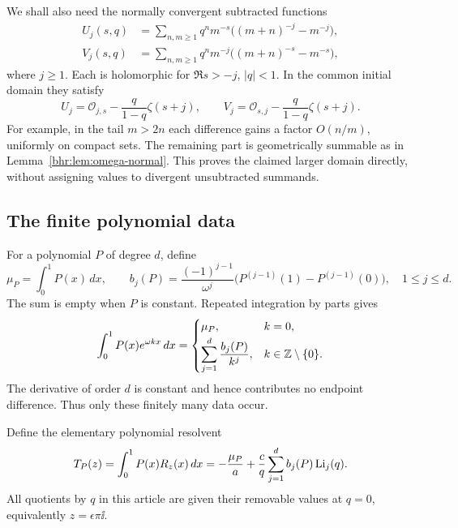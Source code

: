 We shall also need the normally convergent subtracted functions
\begin{align}
 U_j(s,q)&=\sum_{n,m\ge1}q^n m^{-s}
       \bigl((m+n)^{-j}-m^{-j}\bigr),\label{bhr:eq:U}\\
 V_j(s,q)&=\sum_{n,m\ge1}q^n m^{-j}
       \bigl((m+n)^{-s}-m^{-s}\bigr),\label{bhr:eq:V}
\end{align}
where $j\ge1$. Each is holomorphic for $\Re s>-j$, $|q|<1$.
In the common initial domain they satisfy
\begin{equation}\label{bhr:eq:UV-continuation}
 U_j=\mathcal O_{j,s}-\frac{q}{1-q}\zeta(s+j),\qquad
 V_j=\mathcal O_{s,j}-\frac{q}{1-q}\zeta(s+j).
\end{equation}
For example, in the tail $m>2n$ each difference gains a factor
$O(n/m)$, uniformly on compact sets. The remaining part is
geometrically summable as in Lemma~\ref{bhr:lem:omega-normal}.
This proves the claimed larger domain directly, without assigning
values to divergent unsubtracted summands.

\subsection{The finite polynomial data}

For a polynomial $P$ of degree $d$, define
\begin{equation}\label{bhr:eq:polynomial-data}
 \mu_P=\int_0^1P(x)\,dx,\qquad
 b_j(P)=\frac{(-1)^{j-1}}{\omega^j}
    \bigl(P^{(j-1)}(1)-P^{(j-1)}(0)\bigr),\quad 1\le j\le d.
\end{equation}
The sum is empty when $P$ is constant. Repeated integration by
parts gives
\begin{equation}\label{bhr:eq:P-fourier}
 \int_0^1P(x)e^{\omega kx}\,dx
 =\begin{cases}
   \mu_P,& k=0,\\[2pt]
   \displaystyle\sum_{j=1}^d\frac{b_j(P)}{k^j},& k\in\mathbb Z\setminus\{0\}.
  \end{cases}
\end{equation}
The derivative of order $d$ is constant and hence contributes no
endpoint difference. Thus only these finitely many data occur.

Define the elementary polynomial resolvent
\begin{equation}\label{bhr:eq:Tpoly}
 T_P(z)=\int_0^1P(x)R_z(x)\,dx
       =-\frac{\mu_P}{a}+
          \frac cq\sum_{j=1}^d b_j(P)\operatorname{Li}_j(q).
\end{equation}
All quotients by $q$ in this article are given their removable
values at $q=0$, equivalently $z=\epsilon\pi\ii$.

